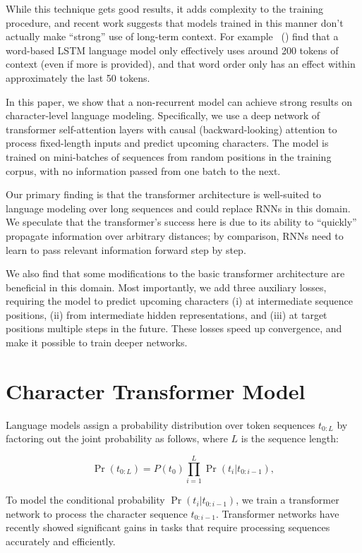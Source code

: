 \documentclass[letterpaper]{article}
\newcommand{\newcite}[1]{\citeauthor{#1}~(\citeyear{#1})}
\begin{document}
While this technique gets good results, it adds complexity to the training procedure, and recent work suggests that models trained in this manner don't actually make ``strong'' use of long-term context.
For example \newcite{khandelwal2018lm} find that a word-based LSTM language model only effectively uses around 200 tokens of context (even if more is provided), and that word order only has an effect within approximately the last 50 tokens.


In this paper, we show that a non-recurrent model can achieve strong results on character-level language modeling.
Specifically, we use a deep network of transformer self-attention layers \cite{NIPS2017_7181} with causal (backward-looking) attention to process fixed-length inputs and predict upcoming characters.
The model is trained on mini-batches of sequences from random positions in the training corpus, with no information passed from one batch to the next.

Our primary finding is that the transformer architecture is well-suited to language modeling over long sequences and could replace RNNs in this domain.
We speculate that the transformer's success here is due to its ability to ``quickly'' propagate information over arbitrary distances; by comparison, RNNs need to learn to pass relevant information forward step by step.

We also find that some modifications to the basic transformer architecture are beneficial in this domain.
Most importantly, we add three auxiliary losses, requiring the model to predict upcoming characters (i) at intermediate sequence positions, (ii) from intermediate hidden representations, and (iii) at target positions multiple steps in the future.
These losses speed up convergence, and make it possible to train deeper networks.



\section{Character Transformer Model}

Language models assign a probability distribution over token sequences $t_{0:L}$ by factoring out the joint probability as follows, where $L$ is the sequence length:

\begin{equation}
    \Pr(t_{0:L}) = P(t_0) \prod_{i=1}^{L} \Pr(t_i|t_{0:i-1}),
\end{equation}

To model the conditional probability $\Pr(t_i|t_{0:i-1})$, we train a transformer network to process the character sequence $t_{0:i-1}$.
Transformer networks have recently showed significant gains in tasks that require processing sequences accurately and efficiently.
\end{document}
